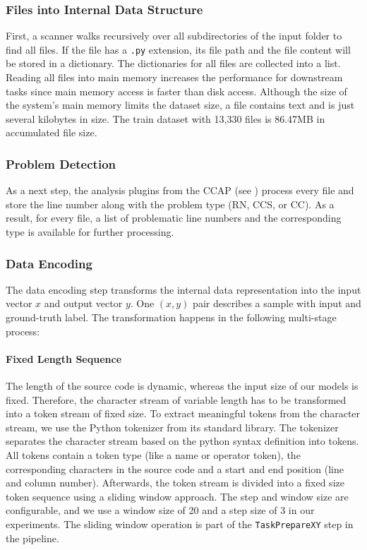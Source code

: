 \subsubsection{Files into Internal Data Structure}
First, a scanner walks recursively over all subdirectories of the input folder to find all files. If the file has a \texttt{.py} extension, its file path and the file content will be stored in a dictionary. The dictionaries for all files are collected into a list. 
Reading all files into main memory increases the performance for downstream tasks since main memory access is faster than disk access. Although the size of the system's main memory limits the dataset size, a file contains text and is just several kilobytes in size. The train dataset with 13,330 files is 86.47MB in accumulated file size.

\subsubsection{Problem Detection}\label{sec:problem_detection}
As a next step, the analysis plugins from the CCAP (see ) process every file and store the line number along with the problem type (RN, CCS, or CC). As a result, for every file, a list of problematic line numbers and the corresponding type is available for further processing. 

\subsubsection{Data Encoding}\label{sec:data_encoding}
The data encoding step transforms the internal data representation into the input vector $x$ and output vector $y$. One $(x,y)$ pair describes a sample with input and ground-truth label. The transformation happens in the following multi-stage process:
\paragraph{Fixed Length Sequence}
The length of the source code is dynamic, whereas the input size of our models is fixed. Therefore, the character stream of variable length has to be transformed into a token stream of fixed size. 
To extract meaningful tokens from the character stream, we use the Python tokenizer from its standard library. The tokenizer separates the character stream based on the python syntax definition into tokens. All tokens contain a token type (like a name or operator token), the corresponding characters in the source code and a start and end position (line and column number). Afterwards, the token stream is divided into a fixed size token sequence using a sliding window approach. The step and window size are configurable, and we use a window size of 20 and a step size of 3 in our experiments. The sliding window operation is part of the \texttt{TaskPrepareXY} step in the pipeline.
